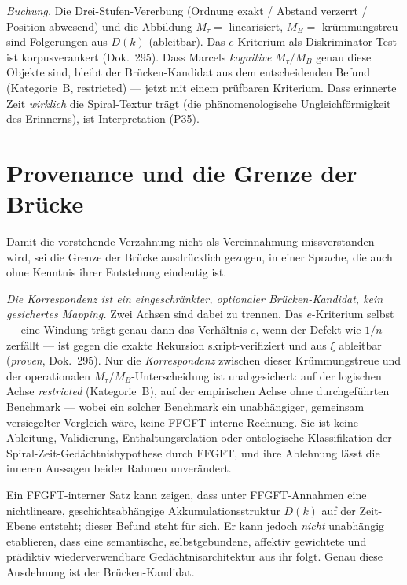 \emph{Buchung.} Die Drei-Stufen-Vererbung (Ordnung exakt / Abstand verzerrt / Position
abwesend) und die Abbildung $M_\tau=$ linearisiert, $M_B=$ krümmungstreu sind Folgerungen aus
$D(k)$ (ableitbar). Das $e$-Kriterium als Diskriminator-Test ist korpusverankert (Dok.~295).
Dass Marcels \emph{kognitive} $M_\tau/M_B$ genau diese Objekte sind, bleibt der Brücken-Kandidat aus
dem entscheidenden Befund (Kategorie~B, restricted) --- jetzt mit einem prüfbaren
Kriterium.
Dass erinnerte Zeit \emph{wirklich} die Spiral-Textur trägt (die phänomenologische
Ungleichförmigkeit des Erinnerns), ist Interpretation (P35).

\section{Provenance und die Grenze der Brücke}

Damit die vorstehende Verzahnung nicht als Vereinnahmung missverstanden wird, sei die Grenze
der Brücke ausdrücklich gezogen, in einer Sprache, die auch ohne Kenntnis ihrer Entstehung
eindeutig ist.

\emph{Die Korrespondenz ist ein eingeschränkter, optionaler Brücken-Kandidat, kein gesichertes
Mapping.} Zwei Achsen sind dabei zu trennen. Das $e$-Kriterium selbst --- eine Windung trägt
genau dann das Verhältnis $e$, wenn der Defekt wie $1/n$ zerfällt --- ist gegen die exakte
Rekursion skript-verifiziert und aus $\xi$ ableitbar (\emph{proven}, Dok.~295). Nur die
\emph{Korrespondenz} zwischen dieser Krümmungstreue und der operationalen
$M_\tau/M_B$-Unterscheidung ist unabgesichert: auf der logischen Achse \emph{restricted}
(Kategorie~B), auf der empirischen Achse ohne durchgeführten Benchmark --- wobei ein solcher
Benchmark ein unabhängiger, gemeinsam versiegelter Vergleich wäre, keine FFGFT-interne Rechnung.
Sie ist keine Ableitung, Validierung, Enthaltungsrelation oder ontologische Klassifikation der
Spiral-Zeit-Gedächtnishypothese durch FFGFT, und ihre Ablehnung lässt die inneren Aussagen
beider Rahmen unverändert.

Ein FFGFT-interner Satz kann zeigen, dass unter FFGFT-Annahmen eine nichtlineare,
geschichtsabhängige Akkumulationsstruktur $D(k)$ auf der Zeit-Ebene entsteht; dieser Befund
steht für sich. Er kann jedoch \emph{nicht} unabhängig etablieren, dass eine semantische,
selbstgebundene, affektiv gewichtete und prädiktiv wiederverwendbare Gedächtnisarchitektur aus
ihr folgt. Genau diese Ausdehnung ist der Brücken-Kandidat.

